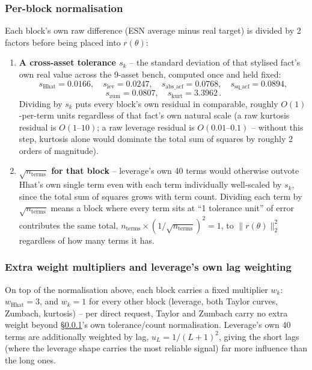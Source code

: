 \documentclass[11pt]{article}
\begin{document}
\subsubsection{Per-block normalisation}
\label{sec:normalisation}
Each block's own raw difference (ESN average minus real target) is
divided by 2 factors before being placed into $r(\theta)$:
\begin{enumerate}
\item \textbf{A cross-asset tolerance $s_k$} -- the standard deviation of
that stylised fact's own real value across the 9-asset bench, computed
once and held fixed:
\[
s_{\text{Hhat}}=0.0166,\quad s_{\text{lev}}=0.0247,\quad
s_{\text{abs\_acf}}=0.0768,\quad s_{\text{sq\_acf}}=0.0894,
\]
\[
s_{\text{zum}}=0.0807,\quad s_{\text{kurt}}=3.3962\, .
\]
Dividing by $s_k$ puts every block's own residual in comparable, roughly
$O(1)$-per-term units regardless of that fact's own natural scale (a raw
kurtosis residual is $O(1\text{--}10)$; a raw leverage residual is
$O(0.01\text{--}0.1)$ -- without this step, kurtosis alone would dominate
the total sum of squares by roughly 2 orders of magnitude).
\item \textbf{$\sqrt{n_{\text{terms}}}$ for that block} -- leverage's own
40 terms would otherwise outvote Hhat's own single term even with each
term individually well-scaled by $s_k$, since the total sum of squares
grows with term count. Dividing each term by $\sqrt{n_{\text{terms}}}$
means a block where every term sits at ``1 tolerance unit'' of error
contributes the same total, $n_{\text{terms}}\times(1/\sqrt{n_{\text{terms}}})^2=1$,
to $\lVert r(\theta)\rVert_2^2$ regardless of how many terms it has.
\end{enumerate}

\subsubsection{Extra weight multipliers and leverage's own lag weighting}
On top of the normalisation above, each block carries a fixed multiplier
$w_k$: $w_{\text{Hhat}}=3$, and $w_k=1$ for every other block (leverage,
both Taylor curves, Zumbach, kurtosis) -- per direct request, Taylor and
Zumbach carry no extra weight beyond \S\ref{sec:normalisation}'s own
tolerance/count normalisation. Leverage's own 40 terms are additionally
weighted by lag, $u_L=1/(L+1)^2$, giving the short lags (where the
leverage shape carries the most reliable signal) far more influence than
the long ones.
\end{document}
